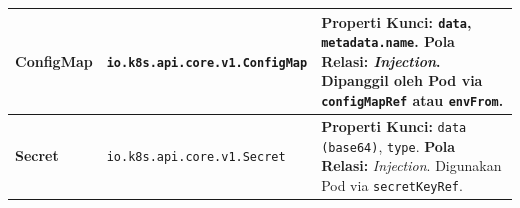 \begin{longtable}{ | p{} | p{} | p{} |}
\textbf{ConfigMap} &
\texttt{io.k8s.api.core.v1.ConfigMap} &
\textbf{Properti Kunci:} \texttt{data}, \texttt{metadata.name}. 
\newline
\textbf{Pola Relasi:} \textit{Injection}. Dipanggil oleh Pod via \texttt{configMapRef} atau \texttt{envFrom}. \\
\hline

\textbf{Secret} &
\texttt{io.k8s.api.core.v1.Secret} &
\textbf{Properti Kunci:} \texttt{data (base64)}, \texttt{type}. 
\newline
\textbf{Pola Relasi:} \textit{Injection}. Digunakan Pod via \texttt{secretKeyRef}. \\
\hline

\end{longtable}